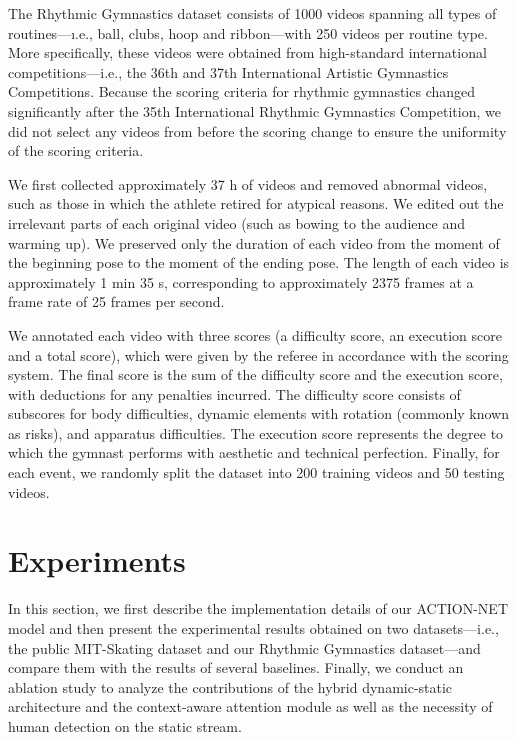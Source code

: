 \documentclass[sigconf]{acmart}
\begin{document}
The Rhythmic Gymnastics dataset consists of 1000 videos spanning all types of routines---\i.e., ball, clubs, hoop and ribbon---with 250 videos per routine type. More specifically, these videos were obtained from high-standard international competitions---i.e., the 36th and 37th International Artistic Gymnastics Competitions. Because the scoring criteria for rhythmic gymnastics changed significantly after the 35th International Rhythmic Gymnastics Competition, we did not select any videos from before the scoring change to ensure the uniformity of the scoring criteria. 

\vspace{5pt}

 We first collected approximately 37 h of videos and removed abnormal videos, such as those in which the athlete retired for atypical reasons. We edited out the irrelevant parts of each original video (such as bowing to the audience and warming up). We preserved only the duration of each video from the moment of the beginning pose to the moment of the ending pose. The length of each video is approximately 1 min 35 s, corresponding to approximately 2375 frames at a frame rate of 25 frames per second.

\vspace{5pt}

 We annotated each video with three scores (a difficulty score, an execution score and a total score), which were given by the referee in accordance with the scoring system. The final score is the sum of the difficulty score and the execution score, with deductions for any penalties incurred. The difficulty score consists of subscores for body difficulties, dynamic elements with rotation (commonly known as risks), and apparatus difficulties. The execution score represents the degree to which the gymnast performs with aesthetic and technical perfection. Finally, for each event, we randomly split the dataset into 200 training videos and 50 testing videos.

\vspace{-0.1cm}

\section{Experiments}

In this section, we first describe the implementation details of our ACTION-NET model and then present the experimental results obtained on two datasets---i.e., the public MIT-Skating dataset and our Rhythmic Gymnastics dataset---and compare them with the results of several baselines. Finally, we conduct an ablation study to analyze the contributions of the hybrid dynamic-static architecture and the context-aware attention module as well as the necessity of human detection on the static stream.
\end{document}
